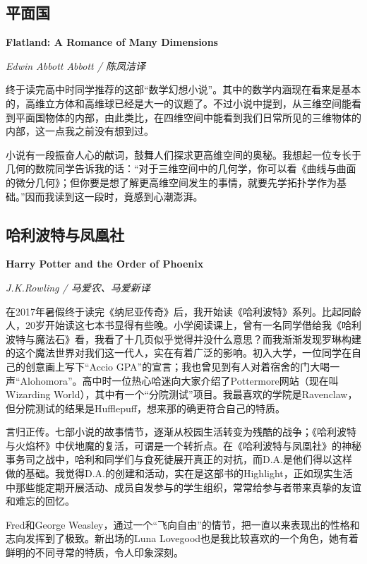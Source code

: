 \subsection*{平面国}
\par \textbf{Flatland: A Romance of Many Dimensions}
\par \emph{Edwin Abbott Abbott /  陈凤洁译} 
\par 终于读完高中时同学推荐的这部“数学幻想小说”。其中的数学内涵现在看来是基本的，高维立方体和高维球已经是大一的议题了。不过小说中提到，从三维空间能看到平面国物体的内部，由此类比，在四维空间中能看到我们日常所见的三维物体的内部，这一点我之前没有想到过。
\par 小说有一段振奋人心的献词，鼓舞人们探求更高维空间的奥秘。我想起一位专长于几何的数院同学告诉我的话：“对于三维空间中的几何学，你可以看《曲线与曲面的微分几何》；但你要是想了解更高维空间发生的事情，就要先学拓扑学作为基础。”因而我读到这一段时，竟感到心潮澎湃。
\par {}

\subsection*{哈利波特与凤凰社}
\par \textbf{Harry Potter and the Order of Phoenix}
\par \emph{J.K.Rowling / 马爱农、马爱新译} 
\par 在2017年暑假终于读完《纳尼亚传奇》后，我开始读《哈利波特》系列。比起同龄人，20岁开始读这七本书显得有些晚。小学阅读课上，曾有一名同学借给我《哈利波特与魔法石》看，我看了十几页似乎觉得并没什么意思？而我渐渐发现罗琳构建的这个魔法世界对我们这一代人，实在有着广泛的影响。初入大学，一位同学在自己的创意画上写下“Accio GPA”的宣言；我也曾见到有人对着宿舍的门大喝一声“Alohomora”。高中时一位热心哈迷向大家介绍了Pottermore网站（现在叫Wizarding World），其中有一个“分院测试”项目。我最喜欢的学院是Ravenclaw，但分院测试的结果是Hufflepuff，想来那的确更符合自己的特质。
\par 言归正传。七部小说的故事情节，逐渐从校园生活转变为残酷的战争；《哈利波特与火焰杯》中伏地魔的复活，可谓是一个转折点。在《哈利波特与凤凰社》的神秘事务司之战中，哈利和同学们与食死徒展开真正的对抗，而D.A.是他们得以这样做的基础。我觉得D.A.的创建和活动，实在是这部书的Highlight，正如现实生活中那些能定期开展活动、成员自发参与的学生组织，常常给参与者带来真挚的友谊和难忘的回忆。
\par Fred和George Weasley，通过一个“飞向自由”的情节，把一直以来表现出的性格和志向发挥到了极致。新出场的Luna Lovegood也是我比较喜欢的一个角色，她有着鲜明的不同寻常的特质，令人印象深刻。
\par {}

